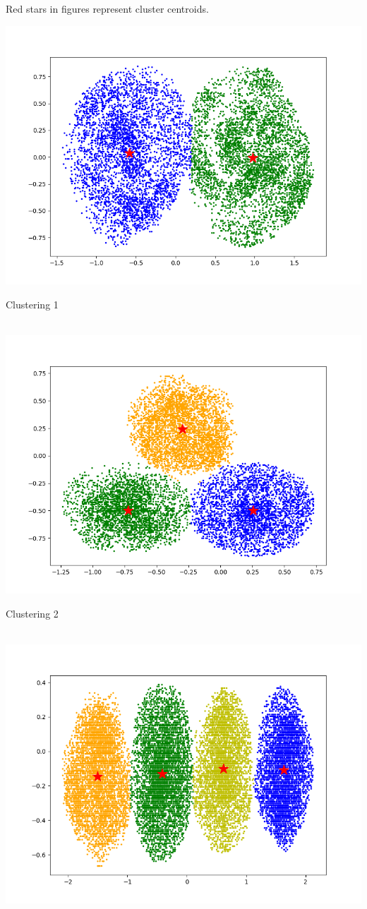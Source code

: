 \documentclass{article}
\begin{document}
Red stars in figures represent cluster centroids.

\includegraphics[width=\linewidth]{clustering_images/clustering1kmeans.png}
\centerline{Clustering 1}\\
\includegraphics[width=\linewidth]{clustering_images/clustering2kmeans.png}
\centerline{Clustering 2}\\
\includegraphics[width=\linewidth]{clustering_images/clustering3kmeans.png}
\end{document}

